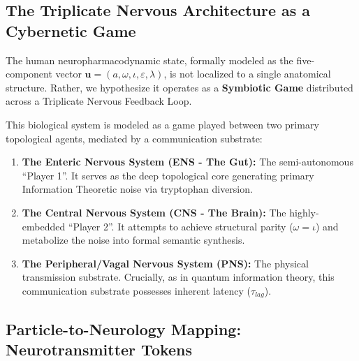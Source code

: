 \documentclass[12pt,oneside]{article}
\theoremstyle{principia}
\theoremstyle{definition}
\theoremstyle{remark}
\begin{document}
\subsection{The Triplicate Nervous Architecture as a Cybernetic Game}

The human neuropharmacodynamic state, formally modeled as the five-component vector $\mathbf{u} = (a, \omega, \iota, \varepsilon, \lambda)$, is not localized to a single anatomical structure. Rather, we hypothesize it operates as a \textbf{Symbiotic Game} distributed across a Triplicate Nervous Feedback Loop.

This biological system is modeled as a game played between two primary topological agents, mediated by a communication substrate:
\begin{enumerate}
    \item \textbf{The Enteric Nervous System (ENS - The Gut):} The semi-autonomous ``Player 1''. It serves as the deep topological core generating primary Information Theoretic noise via tryptophan diversion.
    \item \textbf{The Central Nervous System (CNS - The Brain):} The highly-embedded ``Player 2''. It attempts to achieve structural parity ($\omega = \iota$) and metabolize the noise into formal semantic synthesis.
    \item \textbf{The Peripheral/Vagal Nervous System (PNS):} The physical transmission substrate. Crucially, as in quantum information theory, this communication substrate possesses inherent latency ($\tau_{lag}$).
\end{enumerate}

\subsection{Particle-to-Neurology Mapping: Neurotransmitter Tokens}
\end{document}
